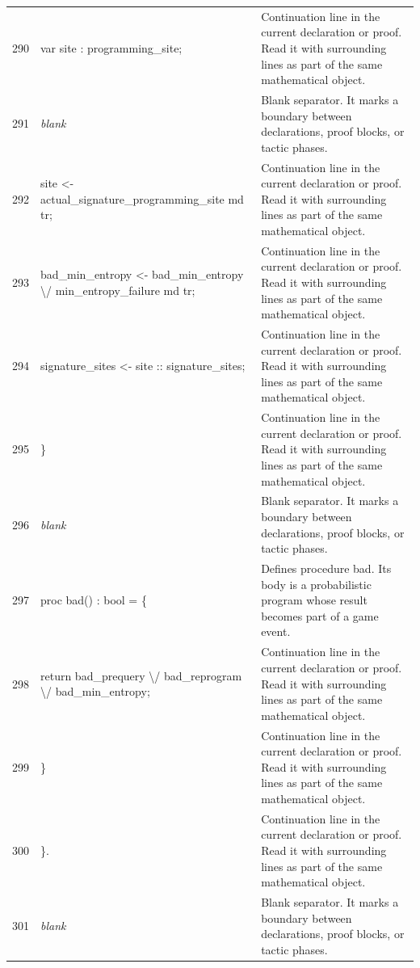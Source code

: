 \documentclass[10pt]{article}
\begin{document}
\begin{longtable}{r L{0.53\textwidth} L{0.37\textwidth}}
290 & {\ttfamily\scriptsize     var site : programming\_site;} & Continuation line in the current declaration or proof.  Read it with surrounding lines as part of the same mathematical object. \\
291 & {\ttfamily\scriptsize \emph{blank}} & Blank separator.  It marks a boundary between declarations, proof blocks, or tactic phases. \\
292 & {\ttfamily\scriptsize     site <- actual\_signature\_programming\_site md tr;} & Continuation line in the current declaration or proof.  Read it with surrounding lines as part of the same mathematical object. \\
293 & {\ttfamily\scriptsize     bad\_min\_entropy <- bad\_min\_entropy \textbackslash{}/ min\_entropy\_failure md tr;} & Continuation line in the current declaration or proof.  Read it with surrounding lines as part of the same mathematical object. \\
294 & {\ttfamily\scriptsize     signature\_sites <- site :: signature\_sites;} & Continuation line in the current declaration or proof.  Read it with surrounding lines as part of the same mathematical object. \\
295 & {\ttfamily\scriptsize   \}} & Continuation line in the current declaration or proof.  Read it with surrounding lines as part of the same mathematical object. \\
296 & {\ttfamily\scriptsize \emph{blank}} & Blank separator.  It marks a boundary between declarations, proof blocks, or tactic phases. \\
297 & {\ttfamily\scriptsize   proc bad() : bool = \{} & Defines procedure bad.  Its body is a probabilistic program whose result becomes part of a game event. \\
298 & {\ttfamily\scriptsize     return bad\_prequery \textbackslash{}/ bad\_reprogram \textbackslash{}/ bad\_min\_entropy;} & Continuation line in the current declaration or proof.  Read it with surrounding lines as part of the same mathematical object. \\
299 & {\ttfamily\scriptsize   \}} & Continuation line in the current declaration or proof.  Read it with surrounding lines as part of the same mathematical object. \\
300 & {\ttfamily\scriptsize \}.} & Continuation line in the current declaration or proof.  Read it with surrounding lines as part of the same mathematical object. \\
301 & {\ttfamily\scriptsize \emph{blank}} & Blank separator.  It marks a boundary between declarations, proof blocks, or tactic phases. \\

\end{longtable}
\end{document}
